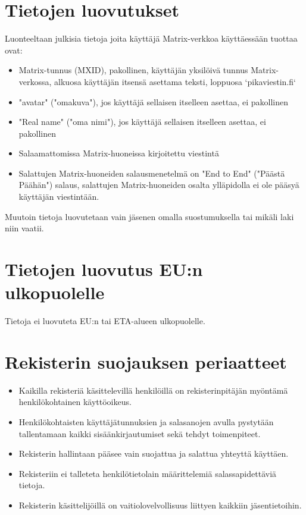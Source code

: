 \documentclass[a4paper]{vakioasiakirja}
\begin{document}
\section{Tietojen luovutukset}\align
Luonteeltaan julkisia tietoja joita käyttäjä Matrix-verkkoa käyttäessään tuottaa ovat:
\begin{itemize}
\item{Matrix-tunnus (MXID), pakollinen, käyttäjän yksilöivä tunnus Matrix-verkossa, alkuosa käyttäjän itsensä asettama teksti, loppuosa `pikaviestin.fi`}
\item{"avatar" ("omakuva"), jos käyttäjä sellaisen itselleen asettaa, ei pakollinen}
\item{"Real name" ("oma nimi"), jos käyttäjä sellaisen itselleen asettaa, ei pakollinen}
\item{Salaamattomissa Matrix-huoneissa kirjoitettu viestintä}
\item{Salattujen Matrix-huoneiden salausmenetelmä on "End to End" ("Päästä Päähän") salaus, salattujen Matrix-huoneiden osalta ylläpidolla ei ole pääsyä käyttäjän viestintään.}
\end{itemize}

Muutoin tietoja luovutetaan vain jäsenen omalla suostumuksella tai mikäli laki niin vaatii.

\section{Tietojen luovutus EU:n ulkopuolelle}\align
Tietoja ei luovuteta EU:n tai ETA-alueen ulkopuolelle.

\section{Rekisterin suojauksen periaatteet}\align
\begin{itemize}
\item{Kaikilla rekisteriä käsittelevillä henkilöillä on rekisterinpitäjän myöntämä henkilökohtainen käyttöoikeus.}
\item{Henkilökohtaisten käyttäjätunnuksien ja salasanojen avulla pystytään tallentamaan kaikki sisäänkirjautumiset sekä tehdyt toimenpiteet.}
\item{Rekisterin hallintaan pääsee vain suojattua ja salattua yhteyttä käyttäen.}
\item{Rekisteriin ei talleteta henkilötietolain määrittelemiä salassapidettäviä tietoja.}
\item{Rekisterin käsittelijöillä on vaitiolovelvollisuus liittyen kaikkiin jäsentietoihin.}
\end{itemize}
\end{document}
